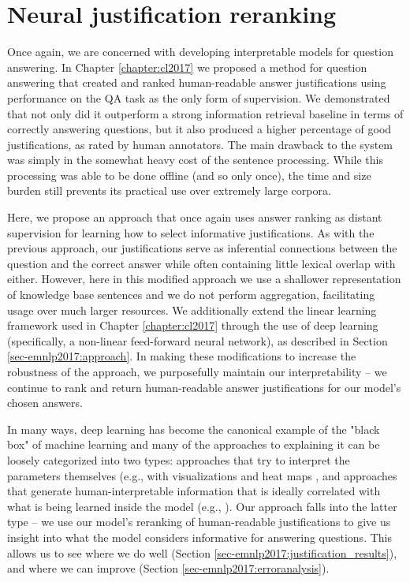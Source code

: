 \section{Neural justification reranking}
\label{sec-emnlp2017:intro}


Once again, we are concerned with developing interpretable models for question answering.  In Chapter \ref{chapter:cl2017} we proposed a method for question answering that created and ranked human-readable answer justifications using performance on the QA task as the only form of supervision.  We demonstrated that not only did it outperform a strong information retrieval baseline in terms of correctly answering questions, but it also produced a higher percentage of good justifications, as rated by human annotators. The main drawback to the system was simply in the somewhat heavy cost of the sentence processing.  While this processing was able to be done offline (and so only once), the time and size burden still prevents its practical use over extremely large corpora. 

Here, we propose an approach that once again uses answer ranking as distant supervision for learning how to select informative justifications.  As with the previous approach, our justifications serve as inferential connections between the question and the correct answer while often containing little lexical overlap with either.  However, here in this  modified approach we use a  shallower representation of knowledge base sentences and we do not perform aggregation, facilitating usage over much larger resources.  
We additionally extend the linear learning framework used in Chapter \ref{chapter:cl2017} through the use of deep learning (specifically, a non-linear feed-forward neural network), as described in Section \ref{sec-emnlp2017:approach}.  
In making these modifications to increase the robustness of the approach, we purposefully maintain our interpretability -- we continue to rank and return human-readable answer justifications for our model's chosen answers.

In many ways, deep learning has become the canonical example of the "black box" of machine learning and many of the approaches to explaining it can be loosely categorized into two types: approaches that try to interpret the parameters themselves (e.g., with visualizations and heat maps \citep{Zeiler2014VisualizingAU,nips15_hermann, Li2016VisualizingAU}, and approaches that generate human-interpretable information that is ideally correlated with what is being learned inside the model (e.g., \citet{Lei2016RationalizingNP}). Our approach falls into the latter type -- 
we use our model's reranking of human-readable justifications to give us insight into what the model considers informative for answering questions.  This allows us to see where we do well (Section \ref{sec-emnlp2017:justification_results}), and where we can improve (Section  \ref{sec-emnlp2017:erroranalysis}).

